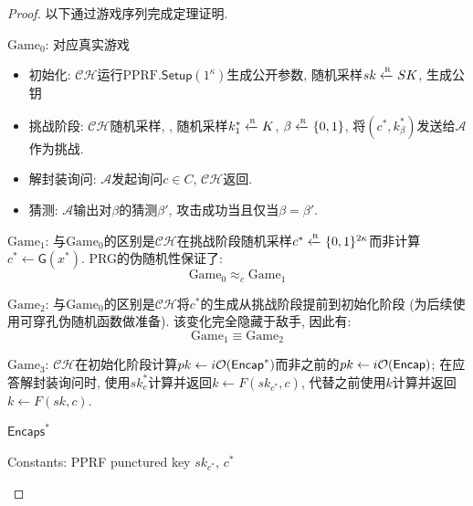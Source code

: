 \begin{proof}
以下通过游戏序列完成定理证明. 
\begin{trivlist}
\item $\text{Game}_0$: 对应真实游戏
\begin{itemize}
\item 初始化: $\mathcal{CH}$运行$\text{PPRF}.\mathsf{Setup}(1^\kappa)$生成公开参数, 随机采样$sk \xleftarrow{\textup{\tiny R}} SK$, 
    生成公钥

\item 挑战阶段: $\mathcal{CH}$随机采样, 
    , 随机采样$k_1^* \xleftarrow{\textup{\tiny R}} K$, $\beta \xleftarrow{\textup{\tiny R}} \{0,1\}$, 
    将$(c^*, k_\beta^*)$发送给$\mathcal{A}$作为挑战. 

\item 解封装询问: $\mathcal{A}$发起询问$c \in C$, $\mathcal{CH}$返回. 

\item 猜测: $\mathcal{A}$输出对$\beta$的猜测$\beta'$, 攻击成功当且仅当$\beta = \beta'$. 
\end{itemize}

\item $\text{Game}_1$: 与$\text{Game}_0$的区别是$\mathcal{CH}$在挑战阶段随机采样$c^* \xleftarrow{\textup{\tiny R}} \{0,1\}^{2\kappa}$而非计算$c^* \leftarrow \mathsf{G}(x^*)$. 
    PRG的伪随机性保证了:
\begin{equation*} 
    \text{Game}_0 \approx_c \text{Game}_1
\end{equation*}

\item $\text{Game}_2$: 与$\text{Game}_0$的区别是$\mathcal{CH}$将$c^*$的生成从挑战阶段提前到初始化阶段 (为后续使用可穿孔伪随机函数做准备). 
    该变化完全隐藏于敌手, 因此有:  
\begin{equation*} 
    \text{Game}_1 \equiv \text{Game}_2
\end{equation*}

\item $\text{Game}_3$: $\mathcal{CH}$在初始化阶段计算$pk \leftarrow i\mathcal{O}(\mathsf{Encap}^*)$而非之前的$pk \leftarrow i\mathcal{O}(\mathsf{Encap})$; 
    在应答解封装询问时, 使用$sk_c^*$计算并返回$k \leftarrow F(sk_{c^*}, c)$, 代替之前使用$k$计算并返回$k \leftarrow F(sk, c)$. 

\begin{framed}
\begin{minipage}[center]{\textwidth}
\vspace{-1em}
\begin{center}
    $\mathsf{Encaps}^*$
\end{center}
\begin{trivlist}
    \item Constants: PPRF punctured key $sk_{c^*}$, $c^*$
    

\end{trivlist}
\end{minipage}
\end{framed}
\end{trivlist}
\end{proof}
